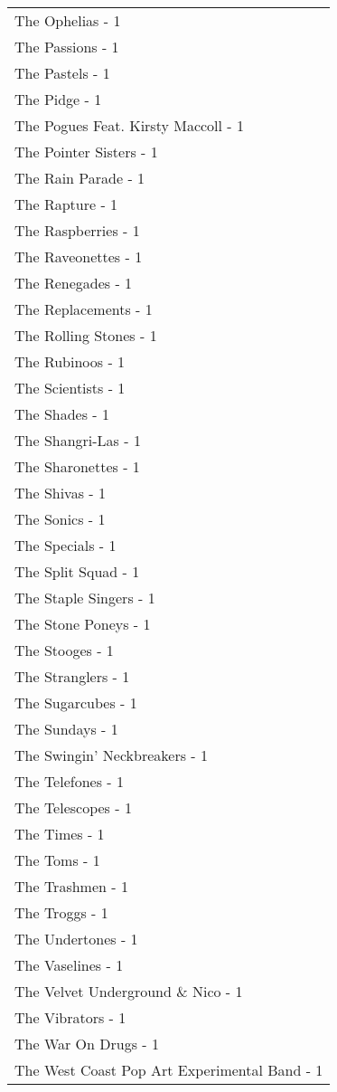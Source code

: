 \documentclass[
]{article}
\begin{document}
\begin{longtable}{l}
The Ophelias - 1 \\ 
The Passions - 1 \\ 
The Pastels - 1 \\ 
The Pidge - 1 \\ 
The Pogues Feat. Kirsty Maccoll - 1 \\ 
The Pointer Sisters - 1 \\ 
The Rain Parade - 1 \\ 
The Rapture - 1 \\ 
The Raspberries - 1 \\ 
The Raveonettes - 1 \\ 
The Renegades - 1 \\ 
The Replacements - 1 \\ 
The Rolling Stones - 1 \\ 
The Rubinoos - 1 \\ 
The Scientists - 1 \\ 
The Shades - 1 \\ 
The Shangri-Las - 1 \\ 
The Sharonettes - 1 \\ 
The Shivas - 1 \\ 
The Sonics - 1 \\ 
The Specials - 1 \\ 
The Split Squad - 1 \\ 
The Staple Singers - 1 \\ 
The Stone Poneys - 1 \\ 
The Stooges - 1 \\ 
The Stranglers - 1 \\ 
The Sugarcubes - 1 \\ 
The Sundays - 1 \\ 
The Swingin' Neckbreakers - 1 \\ 
The Telefones - 1 \\ 
The Telescopes - 1 \\ 
The Times - 1 \\ 
The Toms - 1 \\ 
The Trashmen - 1 \\ 
The Troggs - 1 \\ 
The Undertones - 1 \\ 
The Vaselines - 1 \\ 
The Velvet Underground \& Nico - 1 \\ 
The Vibrators - 1 \\ 
The War On Drugs - 1 \\ 
The West Coast Pop Art Experimental Band - 1 \\ 

\end{longtable}
\end{document}
